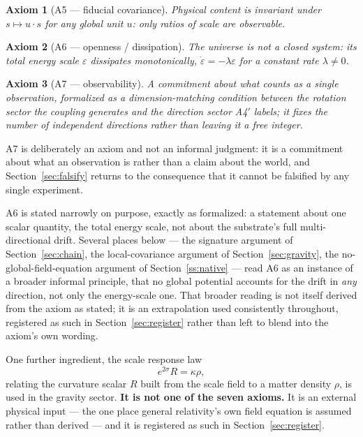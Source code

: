 \documentclass[pdflatex,sn-mathphys-num]{sn-jnl}
\theoremstyle{thmstyleone}
\newtheorem{axiom}{Axiom}
\theoremstyle{thmstylethree}
\theoremstyle{thmstyletwo}
\begin{document}
\begin{axiom}[A5 — fiducial covariance]
Physical content is invariant under $s \mapsto u\cdot s$ for any global
unit $u$: only ratios of scale are observable.
\end{axiom}

\begin{axiom}[A6 — openness / dissipation]
The universe is not a closed system: its total energy scale $\varepsilon$
dissipates monotonically, $\dot\varepsilon = -\lambda\varepsilon$ for a
constant rate $\lambda\ne0$.
\end{axiom}

\begin{axiom}[A7 — observability]
A commitment about what counts as a single observation, formalized as a
dimension-matching condition between the rotation sector the coupling
generates and the direction sector A4$'$ labels; it fixes the number of
\emph{independent} directions rather than leaving it a free integer.
\end{axiom}

A7 is deliberately an axiom and not an informal judgment: it is a
commitment about what an observation is rather than a claim about the
world, and Section~\ref{sec:falsify} returns to the consequence that it
cannot be falsified by any single experiment.

A6 is stated narrowly on purpose, exactly as formalized: a statement about
one scalar quantity, the total energy scale, not about the substrate's
full multi-directional drift. Several places below — the signature
argument of Section~\ref{sec:chain}, the local-covariance argument of
Section~\ref{sec:gravity}, the no-global-field-equation argument of
Section~\ref{ss:native} — read A6 as an instance of a broader informal
principle, that no global potential accounts for the drift in
\emph{any} direction, not only the energy-scale one. That broader
reading is not itself derived from the axiom as stated; it is an
extrapolation used consistently throughout, registered as such in
Section~\ref{sec:register} rather than left to blend into the axiom's
own wording.

One further ingredient, the scale response law
\begin{equation}
e^{2\sigma}R = \kappa \rho, \tag{A6$'$}
\end{equation}
relating the curvature scalar $R$ built from the scale field to a matter
density $\rho$, is used in the gravity sector. \textbf{It is not one of
the seven axioms.} It is an external physical input — the one place
general relativity's own field equation is assumed rather than derived —
and it is registered as such in Section~\ref{sec:register}.
\end{document}
